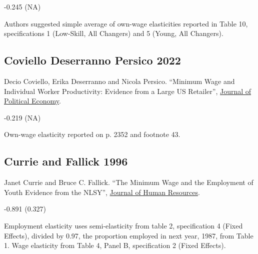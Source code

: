 \vspace{0.7em}

 -0.245 (NA)

\vspace{0.7em}

 Authors suggested simple average of own-wage elasticities reported in Table 10, specifications 1 (Low-Skill, All Changers) and 5 (Young, All Changers).

\subsection*{Coviello Deserranno Persico 2022}
\vspace{-0.7em}

\noindent Decio Coviello, Erika Deserranno and Nicola Persico. ``Minimum Wage and Individual Worker Productivity: Evidence from a Large US Retailer'', \href{https://doi.org/10.1086/720397}{Journal of Political Economy}.

\vspace{0.7em}

 -0.219 (NA)

\vspace{0.7em}

 Own-wage elasticity reported on p. 2352 and footnote 43.

\subsection*{Currie and Fallick 1996}
\vspace{-0.7em}

\noindent Janet Currie and Bruce C. Fallick. ``The Minimum Wage and the Employment of Youth Evidence from the NLSY'', \href{https://doi.org/10.2307/146069}{Journal of Human Resources}.

\vspace{0.7em}

 -0.891 (0.327)

\vspace{0.7em}

 Employment elasticity uses semi-elasticity from table 2, specification 4 (Fixed Effects), divided by 0.97, the proportion employed in next year, 1987, from Table 1. Wage elasticity from Table 4, Panel B, specification 2 (Fixed Effects).

